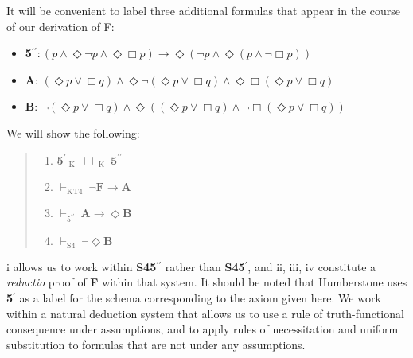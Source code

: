 It will be convenient to label three additional formulas that appear in the course of our derivation of F:
\begin{itemize}[label={}]
\setlength\itemsep{.3 pt}
\item{\textbf{5}$^{\prime\prime}\!: (p \wedge \Diamond\neg p \wedge \Diamond\Box p) \rightarrow \Diamond(\neg p \wedge \Diamond(p\wedge \neg \Box p))$}
\item{\textbf{A}: $(\Diamond{p}\vee \Box q) \wedge \Diamond\neg (\Diamond{p}\vee \Box q) \wedge \Diamond\Box (\Diamond{p}\vee \Box q)$}
\item{\textbf{B}: $\neg (\Diamond{p}\vee \Box q) \wedge \Diamond((\Diamond{p}\vee \Box q) \wedge \neg \Box (\Diamond{p}\vee \Box q))$}
\end{itemize}
We will show the following:
\begin{theorem}
\end{theorem}
\begin{quote}
\begin{enumerate}[label=(\roman*)]
\renewcommand {\theenumi} {\roman{enumi}}
\setlength\itemsep{.3 pt}
\item{\textbf{5}$^{\prime}~_{\text{K}}\!{\dashv}{\vdash}_\text{K}~\textbf{5}^{\prime\prime}$}
\item{$\vdash_\text{KT4} ~ \neg \textbf{F}\rightarrow \textbf{A}$ }
\item{$\vdash_{\text{5}^{\prime\prime}} ~\textbf{A}\rightarrow \Diamond\textbf{B}$ }
\item{$\vdash_\text{S4} ~\neg \Diamond\textbf{B}$ }
\end{enumerate}
\end{quote}
i allows us to work within \textbf{S45}$^{\prime\prime}$ rather than \textbf{S45}$^\prime$, and ii, iii, iv constitute a \textit{reductio} proof of \textbf{F} within that system. It should be noted that Humberstone uses \textbf{5}$^\prime$ as a label for the schema corresponding to the axiom given here. We work within a natural deduction system that allows us to use a rule of truth-functional consequence under assumptions, and to apply rules of necessitation and uniform substitution to formulas that are not under any assumptions.
